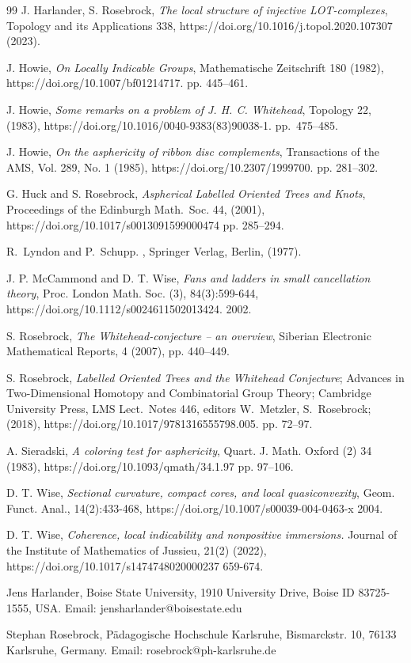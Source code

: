 \documentclass[12pt]{amsart}
\theoremstyle{definition}
\begin{document}
\begin{thebibliography}{99}
J. Harlander, S. Rosebrock, {\em The local structure of injective LOT-complexes},  Topology and its Applications 338, https://doi.org/10.1016/j.topol.2020.107307 (2023).

 J. Howie, {\em On Locally Indicable Groups}, Mathematische Zeitschrift 180  (1982),  https://doi.org/10.1007/bf01214717. pp. 445--461.

 J. Howie, {\em Some remarks on a problem of {J}. {H}. {C}. {W}hitehead}, Topology 22, (1983),  https://doi.org/10.1016/0040-9383(83)90038-1. pp.~475--485.

 J. Howie, {\em On the asphericity of ribbon disc complements}, Transactions of the AMS, Vol. 289, No. 1 (1985),  https://doi.org/10.2307/1999700. pp. 281--302.

G. Huck and S. Rosebrock, {\em Aspherical Labelled Oriented Trees and Knots}, Proceedings of the Edinburgh Math.~Soc. 44, (2001), https://doi.org/10.1017/s0013091599000474  pp. 285--294.

R.~Lyndon and P.~Schupp.
, Springer Verlag, Berlin, (1977).

 J. P. McCammond and D. T. Wise, {\em Fans and ladders in small cancellation theory}, Proc. London Math. Soc. (3), 84(3):599-644, https://doi.org/10.1112/s0024611502013424. 2002.

 S. Rosebrock, {\em The Whitehead-conjecture -- an overview}, Siberian Electronic Mathematical Reports, 4 (2007), pp. 440--449. 

 S. Rosebrock, {\em Labelled Oriented Trees and the Whitehead Conjecture}; 
Advances in Two-Dimensional Homotopy and Combinatorial Group Theory;
Cambridge University Press, LMS Lect.~Notes  446, editors
W.~Metzler, S.~Rosebrock; (2018), https://doi.org/10.1017/9781316555798.005. pp. 72--97.

 A. Sieradski, {\em A coloring test for asphericity}, Quart. J. Math. Oxford (2) 34 (1983), https://doi.org/10.1093/qmath/34.1.97 pp. 97--106.

 D. T. Wise, {\em Sectional curvature, compact cores, and local quasiconvexity}, Geom. Funct. Anal., 14(2):433-468,  https://doi.org/10.1007/s00039-004-0463-x  2004.

 D. T. Wise, {\em Coherence, local indicability and  nonpositive immersions.} Journal of the Institute of Mathematics of Jussieu, 21(2) (2022),  https://doi.org/10.1017/s1474748020000237 659-674. 

\end{thebibliography}

\bigskip\noindent Jens Harlander, Boise State University,  1910 University Drive, Boise ID 83725-1555, USA.
Email: jensharlander@boisestate.edu

\bigskip\noindent Stephan Rosebrock, P\"adagogische Hochschule Karlsruhe, Bismarckstr. 10, 76133 Karlsruhe, Germany. Email: rosebrock@ph-karlsruhe.de
\end{document}
